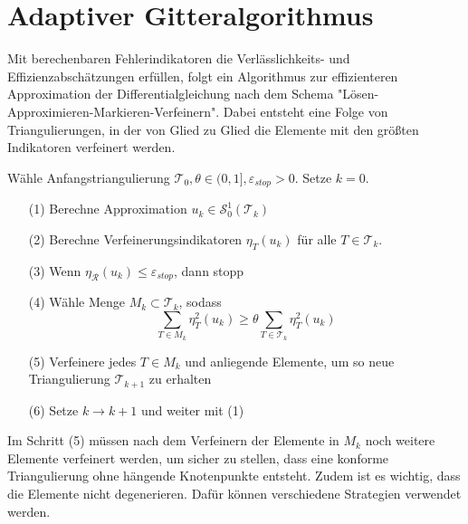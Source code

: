 \chapter{Adaptiver Gitteralgorithmus}
Mit berechenbaren Fehlerindikatoren die Verlässlichkeits- und Effizienzabschätzungen erfüllen, folgt ein Algorithmus zur effizienteren Approximation der Differentialgleichung nach dem Schema "Lösen-Approximieren-Markieren-Verfeinern". Dabei entsteht eine Folge von Triangulierungen, in der von Glied zu Glied die Elemente mit den größten Indikatoren verfeinert werden.
\begin{algorithmus}
	Wähle Anfangstriangulierung $\mathscr{T}_0, \theta\in (0,1],\varepsilon_{stop}>0$. Setze $k=0$.
	\begin{itemize}
		\item[(1)] Berechne Approximation $u_k\in\mathscr{S}_0^1(\mathscr{T}_k)$
		\item[(2)] Berechne Verfeinerungsindikatoren $\eta_T(u_k)$ für alle $T\in\mathscr{T}_k$.
		\item[(3)] Wenn $\eta_{\mathscr{R}}(u_k) \leq \varepsilon_{stop}$, dann stopp
		\item[(4)] Wähle Menge $M_k\subset\mathscr{T}_k$, sodass
		\[ \sum_{T\in M_k} \eta_T^2(u_k) \geq \theta\sum_{T\in\mathscr{T}_k}\eta_T^2(u_k)\]
		\item[(5)] Verfeinere jedes $T\in M_k$ und anliegende Elemente, um so neue Triangulierung $\mathscr{T}_{k+1}$ zu erhalten
		\item[(6)] Setze $k \rightarrow k + 1$ und weiter mit (1)
	\end{itemize}
\end{algorithmus}
Im Schritt (5) müssen nach dem Verfeinern der Elemente in $M_k$ noch weitere Elemente verfeinert werden, um sicher zu stellen, dass eine konforme Triangulierung ohne hängende Knotenpunkte entsteht. Zudem ist es wichtig, dass die Elemente nicht degenerieren. Dafür können verschiedene Strategien verwendet werden.

